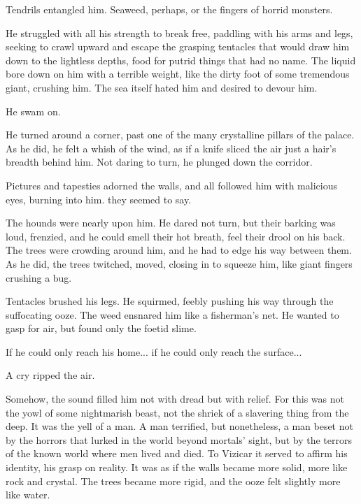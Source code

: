 Tendrils entangled him. Seaweed, perhaps, or the fingers of horrid monsters. 

He struggled with all his strength to break free, paddling with his arms and legs, seeking to crawl upward and escape the grasping tentacles that would draw him down to the lightless depths, food for putrid things that had no name. The liquid bore down on him with a terrible weight, like the dirty foot of some tremendous giant, crushing him. The sea itself hated him and desired to devour him. 

He swam on. 

He turned around a corner, past one of the many crystalline pillars of the palace. As he did, he felt a whish of the wind, as if a knife sliced the air just a hair's breadth behind him. Not daring to turn, he plunged down the corridor. 

Pictures and tapesties adorned the walls, and all followed him with malicious eyes, burning into him.  they seemed to say.  

The hounds were nearly upon him. He dared not turn, but their barking was loud, frenzied, and he could smell their hot breath, feel their drool on his back. The trees were crowding around him, and he had to edge his way between them. As he did, the trees twitched, moved, closing in to squeeze him, like giant fingers crushing a bug. 

Tentacles brushed his legs. He squirmed, feebly pushing his way through the suffocating ooze. The weed ensnared him like a fisherman's net. He wanted to gasp for air, but found only the foetid slime.

If he could only reach his home... if he could only reach the surface... 


A cry ripped the air.

Somehow, the sound filled him not with dread but with relief. For this was not the yowl of some nightmarish beast, not the shriek of a slavering thing from the deep. It was the yell of a man. A man terrified, but nonetheless, a man beset not by the horrors that lurked in the world beyond mortals' sight, but by the terrors of the known world where men lived and died. To Vizicar it served to affirm his identity, his grasp on reality. It was as if the walls became more solid, more like rock and crystal. The trees became more rigid, and the ooze felt slightly more like water. 


